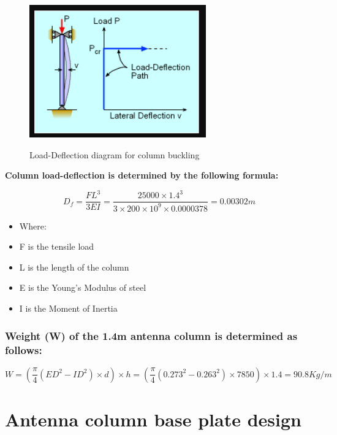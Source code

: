 {\begin{figure}[htp]
    \centering
    \includegraphics[width=3in]{Figures/column_deflection.png}
    \caption{Load-Deflection diagram for column buckling}
    \cite{kurt_2022}
    \label{fig:3.12}
\end{figure}
\textbf{Column load-deflection is determined by the following formula:}

\begin{equation}
 {D}_{f} = \frac{{F}{L}^{3}}{{3}{EI}} = \frac{{25000}\times {{1}.{4}}^{3}}{{3} \times{200}\times{{10}}^{9}\times{0}.{0000378}}  = 0.00302m
\end{equation}

\begin{itemize}[label={}]
    \item Where:
\item F is the tensile load 
\item L is the length of the column 
\item E is the Young’s Modulus of steel
\item I is the Moment of Inertia 
\end{itemize}
	
\subsubsection {Weight (W) of the 1.4m antenna column is determined as follows:}
\begin{equation}
W = (\frac{{\pi}}{{4}}({{ED}}^{2}-{{ID}}^{2})\times{d})\times h = (\frac{{\pi}}{{4}}({{0}.{273}}^{2}- {{0}.{263}}^{2})\times{7850}) \times 1.4  = 90.8Kg/m
\end{equation} 





\section{Antenna column base plate design}

}

